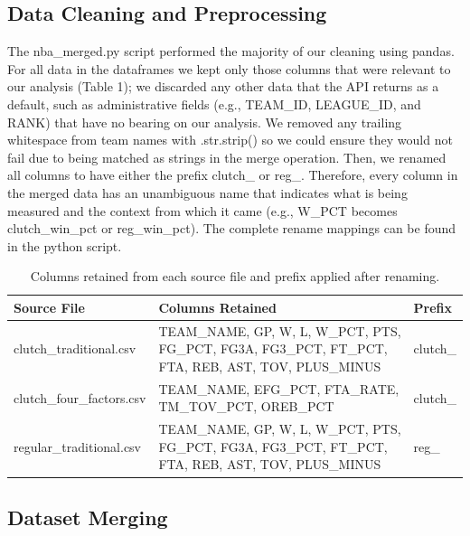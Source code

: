 \subsection{Data Cleaning and Preprocessing}

\begin{sloppypar}
The nba\_merged.py script performed the majority of our cleaning using pandas. For all data in the dataframes we kept only those columns that were relevant to our analysis (Table 1); we discarded any other data that the API returns as a default, such as administrative fields (e.g., TEAM\_ID, LEAGUE\_ID, and RANK) that have no bearing on our analysis. We removed any trailing whitespace from team names with .str.strip() so we could ensure they would not fail due to being matched as strings in the merge operation. Then, we renamed all columns to have either the prefix clutch\_ or reg\_. Therefore, every column in the merged data has an unambiguous name that indicates what is being measured and the context from which it came (e.g., W\_PCT becomes clutch\_win\_pct or reg\_win\_pct). The complete rename mappings can be found in the python script.
\end{sloppypar}

\begin{table}[ht]
    \centering
    \caption{Columns retained from each source file and prefix applied after renaming.}
    \label{tab:columns}
    \renewcommand{\arraystretch}{1.4}
    \small
    \begin{tabular}{@{} l p{8cm} l @{}}
        \toprule
        \textbf{Source File} & \textbf{Columns Retained} & \textbf{Prefix} \\
        \midrule
        clutch\_traditional.csv  &
            TEAM\_NAME, GP, W, L, W\_PCT, PTS, FG\_PCT, FG3A, FG3\_PCT, FT\_PCT, FTA, REB, AST, TOV, PLUS\_MINUS &
            clutch\_ \\[6pt]
        clutch\_four\_factors.csv &
            TEAM\_NAME, EFG\_PCT, FTA\_RATE, TM\_TOV\_PCT, OREB\_PCT &
            clutch\_ \\[6pt]
        regular\_traditional.csv &
            TEAM\_NAME, GP, W, L, W\_PCT, PTS, FG\_PCT, FG3A, FG3\_PCT, FT\_PCT, FTA, REB, AST, TOV, PLUS\_MINUS &
            reg\_ \\
        \bottomrule
    \end{tabular}
\end{table}

\subsection{Dataset Merging}


